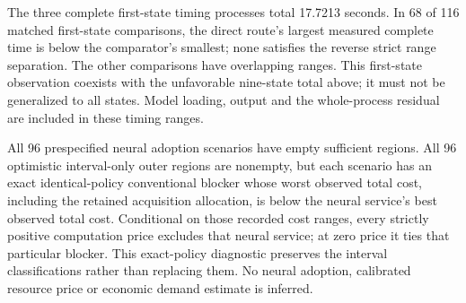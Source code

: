 The three complete first-state timing processes total 17.7213 seconds. In 68
of 116 matched first-state comparisons, the direct route's largest measured
complete time is below the comparator's smallest; none satisfies the reverse
strict range separation. The other comparisons have overlapping ranges. This
first-state observation coexists with the unfavorable nine-state total above;
it must not be generalized to all states. Model loading, output and the
whole-process residual are included in these timing ranges.

All 96 prespecified neural adoption scenarios have empty sufficient regions.
All 96 optimistic interval-only outer regions are nonempty, but each scenario
has an exact identical-policy conventional blocker whose worst observed total
cost, including the retained acquisition allocation, is below the neural
service's best observed total cost. Conditional on those recorded cost ranges,
every strictly positive computation price excludes that neural service; at zero
price it ties that particular blocker. This exact-policy diagnostic preserves
the interval classifications rather than replacing them. No neural adoption,
calibrated resource price or economic demand estimate is inferred.

